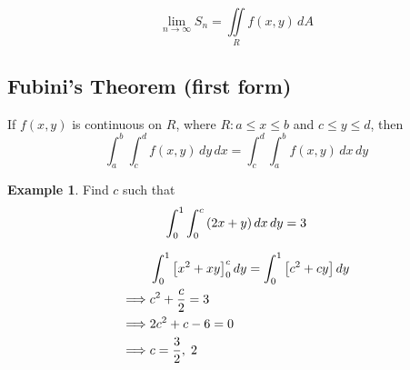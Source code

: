 \documentclass[12pt]{article}
\theoremstyle{definition}
\newtheorem*{example}{Example}
\theoremstyle{definition}
\begin{document}
\[
	\lim_{n \to \infty} S_n = \iint\limits_R f(x, y) \,dA
\]

\subsection{Fubini's Theorem (first form)}
If $f(x, y)$ is continuous on $R$, where $R: a \leq x \leq b$ and $c \leq y \leq d$, then
\[
	\int_a^b \int_c^d f(x, y) \,dy\,dx = \int_c^d \int_a^b f(x, y) \,dx\,dy 
\]

\begin{example}
	Find $c$ such that 
	\[
		\int_0^1 \int_0^c \qty(2x + y) \, dx \, dy = 3
	\]

	\begin{align*}
		&\int_0^1 \qty[x^2 + xy]_0^c \, dy = \int_0^1 \qty[c^2 + cy] \, dy \\
		\implies & c^2 + \frac{c}{2} = 3 \\
		\implies & 2c^2 + c - 6 = 0 \\
		\implies & c = \frac{3}{2}, \; 2
	\end{align*}
\end{example}
\end{document}
